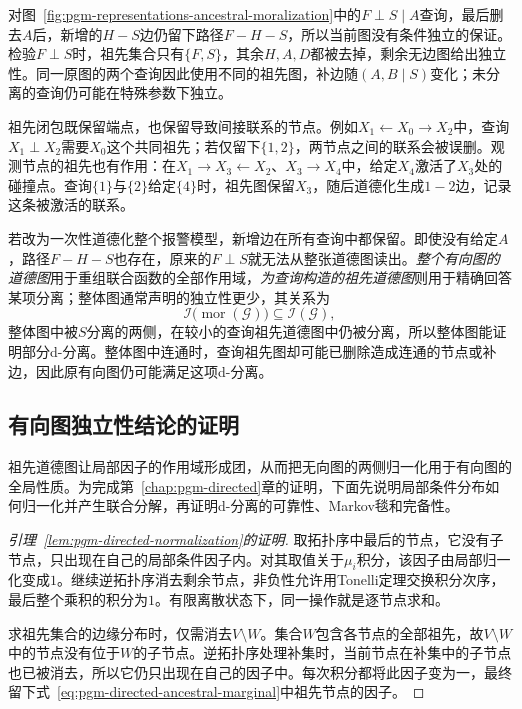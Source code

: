对图~\ref{fig:pgm-representations-ancestral-moralization}中的$F\perp S\mid A$查询，最后删去$A$后，新增的$H-S$边仍留下路径$F-H-S$，所以当前图没有条件独立的保证。检验$F\perp S$时，祖先集合只有$\{F,S\}$，其余$H,A,D$都被去掉，剩余无边图给出独立性。同一原图的两个查询因此使用不同的祖先图，补边随$(A,B\mid S)$变化；未分离的查询仍可能在特殊参数下独立。

祖先闭包既保留端点，也保留导致间接联系的节点。例如$X_1\leftarrow X_0\to X_2$中，查询$X_1\perp X_2$需要$X_0$这个共同祖先；若仅留下$\{1,2\}$，两节点之间的联系会被误删。观测节点的祖先也有作用：在$X_1\to X_3\leftarrow X_2$、$X_3\to X_4$中，给定$X_4$激活了$X_3$处的碰撞点。查询$\{1\}$与$\{2\}$给定$\{4\}$时，祖先图保留$X_3$，随后道德化生成$1-2$边，记录这条被激活的联系。

若改为一次性道德化整个报警模型，新增边在所有查询中都保留。即使没有给定$A$，路径$F-H-S$也存在，原来的$F\perp S$就无法从整张道德图读出。\emph{整个有向图的道德图}用于重组联合函数的全部作用域，\emph{为查询构造的祖先道德图}则用于精确回答某项分离；整体图通常声明的独立性更少，其关系为
\begin{equation}
  \mathcal{I}\bigl(\operatorname{mor}(\mathcal{G})\bigr)
  \subseteq \mathcal{I}(\mathcal{G}),
  \label{eq:pgm-representations-moral-inclusion}
\end{equation}
整体图中被$S$分离的两侧，在较小的查询祖先道德图中仍被分离，所以整体图能证明部分d-分离。整体图中连通时，查询祖先图却可能已删除造成连通的节点或补边，因此原有向图仍可能满足这项d-分离。

\subsection{有向图独立性结论的证明}
\label{sec:pgm-representations-directed-proofs}

祖先道德图让局部因子的作用域形成团，从而把无向图的两侧归一化用于有向图的全局性质。为完成第~\ref{chap:pgm-directed}章的证明，下面先说明局部条件分布如何归一化并产生联合分解，再证明d-分离的可靠性、Markov毯和完备性。

\begin{proof}[引理~\ref{lem:pgm-directed-normalization}的证明]
取拓扑序中最后的节点，它没有子节点，只出现在自己的局部条件因子内。对其取值关于$\mu_i$积分，该因子由局部归一化变成$1$。继续逆拓扑序消去剩余节点，非负性允许用Tonelli定理交换积分次序，最后整个乘积的积分为$1$。有限离散状态下，同一操作就是逐节点求和。

求祖先集合的边缘分布时，仅需消去$V\setminus W$。集合$W$包含各节点的全部祖先，故$V\setminus W$中的节点没有位于$W$的子节点。逆拓扑序处理补集时，当前节点在补集中的子节点也已被消去，所以它仍只出现在自己的因子中。每次积分都将此因子变为一，最终留下式~\eqref{eq:pgm-directed-ancestral-marginal}中祖先节点的因子。
\end{proof}

